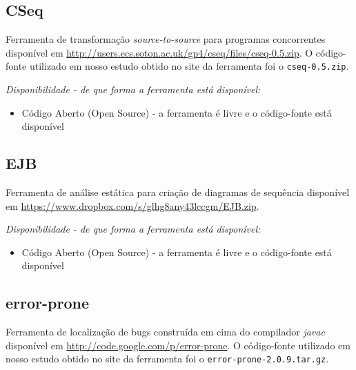 \subsection{CSeq}

Ferramenta de transformação {\it source-to-source} para programas
concorrentes disponível em
\url{http://users.ecs.soton.ac.uk/gp4/cseq/files/cseq-0.5.zip}. O código-fonte
utilizado em nosso estudo obtido no site da ferramenta foi o
\texttt{cseq-0.5.zip}.

\begin{description}

  \item {\it Disponibilidade - de que forma a ferramenta está disponível:}
    \begin{itemize}
      \item Código Aberto (Open Source) - a ferramenta é livre e o código-fonte está disponível
    \end{itemize}

\end{description}

\subsection{EJB}

Ferramenta de análise estática para criação de diagramas de sequência
disponível em
\url{https://www.dropbox.com/s/glhg8any43lccgm/EJB.zip}.

\begin{description}

  \item {\it Disponibilidade - de que forma a ferramenta está disponível:}
    \begin{itemize}
      \item Código Aberto (Open Source) - a ferramenta é livre e o código-fonte está disponível
    \end{itemize}

\end{description}

\subsection{error-prone}

Ferramenta de localização de bugs construída em cima do
compilador {\it javac} disponível em
\url{http://code.google.com/p/error-prone}. O código-fonte utilizado em nosso
estudo obtido no site da ferramenta foi o \texttt{error-prone-2.0.9.tar.gz}.

